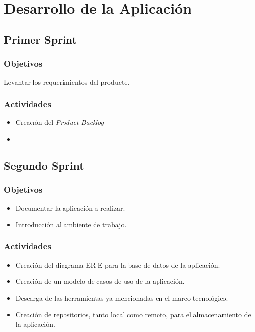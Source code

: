 \chapter{Desarrollo de la Aplicación}
    \section{Primer Sprint}
        \subsection{Objetivos}
        Levantar los requerimientos del producto.
        \subsection{Actividades}
        \begin{itemize}
            \item Creación del \textit{Product Backlog}
            \item 
        \end{itemize}
    \section{Segundo Sprint}
        \subsection{Objetivos}
        \begin{itemize}
            \item Documentar la aplicación a realizar.
            \item Introducción al ambiente de trabajo.
        \end{itemize}
        \subsection{Actividades}
        \begin{itemize}
            \item Creación del diagrama ER-E para la base de datos de la aplicación.
            \item Creación de un modelo de casos de uso de la aplicación.
            \item Descarga de las herramientas ya mencionadas en el marco tecnológico.
            \item Creación de repositorios, tanto local como remoto, para el almacenamiento de la aplicación.
        \end{itemize}
        
